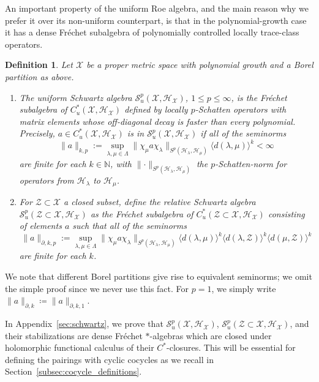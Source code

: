 \documentclass[12pt]{amsart}
\newtheorem{definition}[theorem]{Definition}
\newcommand{\NM}{{\mathbb N}}
\newcommand{\Ss}{{\mathcal S}}
\newcommand{\Hh}{{\mathcal H}}
\newcommand{\Xx}{{\mathcal X}}
\newcommand{\Zz}{{\mathcal Z}}
\newcommand{\pdv}{\partial}
\begin{document}
An important property of the uniform Roe algebra, and the main reason why we prefer it over its non-uniform counterpart, is that in the polynomial-growth case it has a dense Fr\'echet subalgebra of polynomially controlled locally trace-class operators. 
\begin{definition}
Let $\Xx$ be a proper metric space with polynomial growth and a Borel partition as above.
\begin{enumerate}
\item[(i)]
The uniform Schwartz algebra $\Ss^p_u(\Xx, \Hh_\Xx)$, $1\leq p\leq \infty$, is the Fr\'echet subalgebra of $C^*_{u}(\Xx,\Hh_\Xx)$ defined by locally $p$-Schatten operators with matrix elements whose off-diagonal decay is faster than every polynomial.
Precisely, $a\in C^*_u(\Xx,\Hh_\Xx)$ is in $\Ss_u^p(\Xx,\Hh_\Xx)$ if all of the seminorms
$$\|a\|_{k,p} := \sup_{\lambda,\mu \in \Lambda} \|\chi_\mu a\chi_\lambda \|_{S^p(\Hh_\lambda, \Hh_\mu)} \langle d(\lambda,\mu)\rangle^k <\infty$$
are finite for each $k \in \NM$, with $\lVert\cdot\rVert_{S^p(\Hh_{\lambda},\Hh_{\mu})}$ the $p$-Schatten-norm for operators from $\Hh_{\lambda}$ to $\Hh_{\mu}$.
\item[(ii)] 
For $\Zz\subset \Xx$ a closed subset, define the relative Schwartz algebra $\Ss_u^p(\Zz\subset \Xx,\Hh_\Xx)$ as the Fr\'echet subalgebra of $C^*_{u}(\Zz \subset \Xx,\Hh_\Xx)$ consisting of elements $a$ such that all of the seminorms
$$\|a\|_{\pdv,k,p} := \sup_{\lambda,\mu \in \Lambda} \|\chi_\mu a\chi_\lambda\|_{S^p(\Hh_\lambda, \Hh_\mu)} \langle d(\lambda,\mu)\rangle^k \langle d(\lambda,\Zz)\rangle^k \langle d(\mu,\Zz)\rangle^k$$
are finite for each $k$. 
\end{enumerate}
\end{definition}

We note that different Borel partitions give rise to equivalent seminorms; we omit the simple proof since we never use this fact.
For $p=1$, we simply write $\|a\|_{\pdv,k} \coloneqq \|a\|_{\pdv,k,1}$.

In Appendix~\ref{sec:schwartz}, we prove that $\Ss_u^p(\Xx,\Hh_\Xx)$, $\Ss_u^p(\Zz\subset \Xx,\Hh_\Xx)$, and their stabilizations are dense Fr\'echet $\ast$-algebras which are closed under holomorphic functional calculus of their $C^*$-closures. This will be essential for defining the pairings with cyclic cocycles as we recall in Section~\ref{subsec:cocycle_definitions}.
\end{document}
